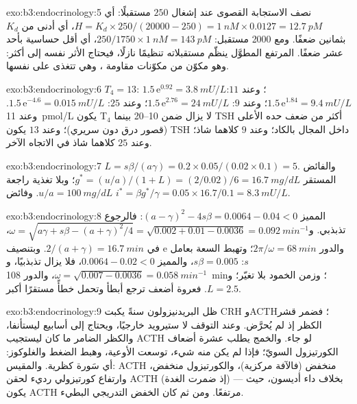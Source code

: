 \begin{solution}{exo:b3:endocrinology:5}
نصف الاستجابة القصوى عند إشغال $250$ مستقبلًا: أي $H = K_{d}\times
250/(\num{20000} - 250) = \qty{1}{nM}\times 0.0127 = \qty{12.7}{pM}$،
أي أدنى من $K_{d}$ بثمانين ضعفًا. ومع \num{2000} مستقبل: $250/1750
\times \qty{1}{nM} = \qty{143}{pM}$، أي أقل حساسية بأحد عشر ضعفًا.
 المرتفع المطوَّل ينظّم مستقبلاته تنظيمًا نازلًا،
فيحتاج الأثر نفسه إلى  أكثر: وهو مكوّن من مكوّنات
مقاومة ، وهي تتغذى على نفسها.
\end{solution}

\begin{solution}{exo:b3:endocrinology:6}
$T_{4} = 13$: $1.5\,\mathrm{e}^{0.92} = \qty{3.8}{mU/L}$؛ وعند $11$:
$1.5\,\mathrm{e}^{1.84} = \qty{9.4}{mU/L}$؛ وعند $9$: $1.5\,\mathrm{e}^{2.76}
= \qty{24}{mU/L}$؛ وعند $25$: $1.5\,\mathrm{e}^{-4.6} = \qty{0.015}{mU/L}$. وعند
\qty{11}{pmol/L} يكون T$_{4}$ لا يزال ضمن \qtyrange{10}{20}{} بينما
TSH أكثر من ضعف حده الأعلى (قصور درق دون سريري)؛ وعند $13$
يكون TSH داخل المجال بالكاد؛ وعند $9$ كلاهما شاذ؛ وعند $25$
كلاهما شاذ في الاتجاه الآخر.
\end{solution}

\begin{solution}{exo:b3:endocrinology:7}
$L = s\beta/(a\gamma) = 0.2\times 0.05/(0.02\times 0.1) = 5$. والفائض
المستقر $g^{*} = (u/a)/(1 + L) = (2/0.02)/6 = \qty{16.7}{mg/dL}$؛ وبلا
تغذية راجعة $u/a = \qty{100}{mg/dL}$. وفائض  $i^{*} = \beta g^{*}/
\gamma = 0.05\times 16.7/0.1 = \qty{8.3}{mU/L}$.
\end{solution}

\begin{solution}{exo:b3:endocrinology:8}
المميز $(a - \gamma)^{2} - 4s\beta = 0.0064 - 0.04 < 0$:
فالرجوع تذبذبي. و$\omega = \sqrt{a\gamma + s\beta - (a+\gamma)^{2}/4} =
\sqrt{0.002 + 0.01 - 0.0036} = \qty{0.092}{min^{-1}}$، والدور $2\pi/
\omega = \qty{68}{min}$؛ وتهبط السعة بعامل $\mathrm{e}$ في $2/(a +
\gamma) = \qty{16.7}{min}$. وبتنصيف $s$: $s\beta = 0.005$، والمميز
$0.0064 - 0.02 < 0$، فلا يزال تذبذبيًا، و$\omega = \sqrt{0.007 - 0.0036}
= \qty{0.058}{min^{-1}}$، والدور \qty{108}{min}؛ وزمن الخمود بلا
تغيّر؛ و$L = 2.5$. فعروة أضعف ترجع أبطأ وتحمل خطأً مستقرًا أكبر.
\end{solution}

\begin{solution}{exo:b3:endocrinology:9}
ظل البريدنيزولون سنةً يكبت CRH وACTH؛ فضمر قشر الكظر إذ لم
يُحرَّض. وعند التوقف لا ستيرويد خارجيًا، ويحتاج 
 إلى أسابيع ليستأنفا، والكظر الضامر ما كان ليستجيب
 ACTH لو جاء. والخمج يطلب عشرة أضعاف الكورتيزول السويّ؛
فإذا لم يكن منه شيء، توسعت الأوعية، وهبط الضغط والغلوكوز:
أي سَورة كظرية. والمقيس: ACTH منخفض (فالآفة مركزية)،
والكورتيزول منخفض، وارتفاع كورتيزولي رديء لحقن ACTH (إذ ضمرت
الغدة) --- بخلاف داء أديسون، حيث يكون ACTH مرتفعًا. ومن ثم
كان الخفض التدريجي البطيء.
\end{solution}

